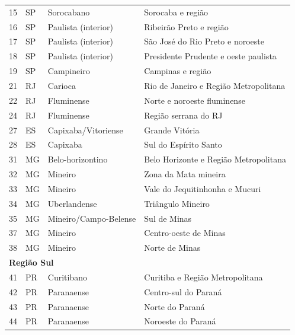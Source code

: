 \begin{table}[ht]
\begin{tabular}{llll}
    15 & SP & Sorocabano            & Sorocaba e região                       \\
    16 & SP & Paulista (interior)   & Ribeirão Preto e região                 \\
    17 & SP & Paulista (interior)   & São José do Rio Preto e noroeste        \\
    18 & SP & Paulista (interior)   & Presidente Prudente e oeste paulista    \\
    19 & SP & Campineiro            & Campinas e região                       \\
    21 & RJ & Carioca               & Rio de Janeiro e Região Metropolitana    \\
    22 & RJ & Fluminense            & Norte e noroeste fluminense             \\
    24 & RJ & Fluminense            & Região serrana do RJ                    \\
    27 & ES & Capixaba/Vitoriense   & Grande Vitória                          \\
    28 & ES & Capixaba              & Sul do Espírito Santo                   \\
    31 & MG & Belo-horizontino      & Belo Horizonte e Região Metropolitana    \\
    32 & MG & Mineiro               & Zona da Mata mineira                    \\
    33 & MG & Mineiro               & Vale do Jequitinhonha e Mucuri          \\
    34 & MG & Uberlandense          & Triângulo Mineiro                       \\
    35 & MG & Mineiro/Campo-Belense & Sul de Minas                            \\
    37 & MG & Mineiro               & Centro-oeste de Minas                   \\
    38 & MG & Mineiro               & Norte de Minas                          \\
    \midrule
    \multicolumn{4}{l}{\textbf{Região Sul}} \\ 
    41 & PR & Curitibano        & Curitiba e Região Metropolitana     \\
    42 & PR & Paranaense        & Centro-sul do Paraná                \\
    43 & PR & Paranaense        & Norte do Paraná                     \\
    44 & PR & Paranaense        & Noroeste do Paraná                  \\

\end{tabular}
\end{table}
